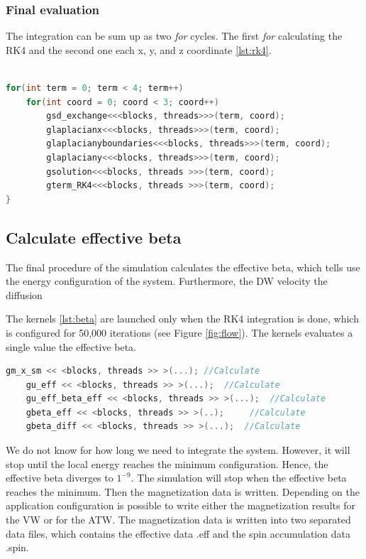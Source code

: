 \subsubsection{Final evaluation}

The integration can be sum up as two \textit{for} cycles. The first \textit{for} calculating the RK4 and the second one each x, y, and z coordinate \ref{lst:rk4}.

\begin{lstlisting}[language=C++, label={lst:rk4}, caption={Summarize of Runge and Kutta 4th Integration}]	

for(int term = 0; term < 4; term++)
	for(int coord = 0; coord < 3; coord++)
    	gsd_exchange<<<blocks, threads>>>(term, coord);
    	glaplacianx<<<blocks, threads>>>(term, coord);
    	glaplacianyboundaries<<<blocks, threads>>>(term, coord);
    	glaplaciany<<<blocks, threads>>>(term, coord);
    	gsolution<<<blocks, threads >>>(term, coord);
    	gterm_RK4<<<blocks, threads >>>(term, coord);
}
\end{lstlisting}


\subsection{Calculate effective beta}

The final procedure of the simulation calculates the effective beta, which tells use the energy configuration of the system. Furthermore, the DW velocity the diffusion

The kernels \ref{lst:beta} are launched only when the RK4 integration is done, which is configured for 50,000 iterations (see Figure \ref{fig:flow}). The kernels evaluates a single value the effective beta.

\begin{lstlisting}[language=C++, label={lst:beta}, caption={Calculate effective beta}]
    gm_x_sm << <blocks, threads >> >(...); //Calculate
    gu_eff << <blocks, threads >> >(...);  //Calculate 
    gu_eff_beta_eff << <blocks, threads >> >(...); 	//Calculate
    gbeta_eff << <blocks, threads >> >(..); 	//Calculate
    gbeta_diff << <blocks, threads >> >(...);  //Calculate             
\end{lstlisting}



We do not know for how long we need to integrate the system. However, it will stop until the local energy reaches the minimum configuration. Hence, the effective beta diverges to $1^{-9}$. The simulation will stop when the effective beta reaches the minimum. Then the magnetization data is written. Depending on the application configuration is possible to write either the magnetization results for the VW or for the ATW. The magnetization data is written into two separated data files, which contains the effective data .eff and the spin accumulation data .spin.

